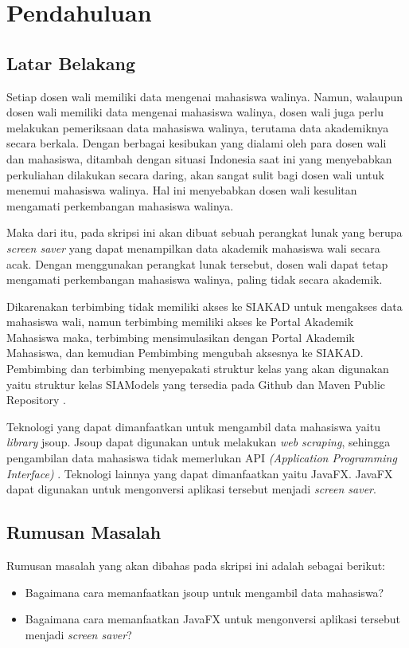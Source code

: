 \chapter{Pendahuluan}
\label{chap:intro}
   
\section{Latar Belakang}
\label{sec:label}

Setiap dosen wali memiliki data mengenai mahasiswa walinya. Namun, walaupun dosen wali memiliki data mengenai mahasiswa walinya, dosen wali juga perlu melakukan pemeriksaan data mahasiswa walinya, terutama data akademiknya secara berkala. Dengan berbagai kesibukan yang dialami oleh para dosen wali dan mahasiswa, ditambah dengan situasi Indonesia saat ini yang menyebabkan perkuliahan dilakukan secara daring, akan sangat sulit bagi dosen wali untuk menemui mahasiswa walinya. Hal ini menyebabkan dosen wali kesulitan mengamati perkembangan mahasiswa walinya. 

Maka dari itu, pada skripsi ini akan dibuat sebuah perangkat lunak yang berupa \textit{screen saver} yang dapat menampilkan data akademik mahasiswa wali secara acak. Dengan menggunakan perangkat lunak tersebut, dosen wali dapat tetap mengamati perkembangan mahasiswa walinya, paling tidak secara akademik.

Dikarenakan terbimbing tidak memiliki akses ke SIAKAD \cite{siakad} untuk mengakses data mahasiswa wali, namun terbimbing memiliki akses ke Portal Akademik Mahasiswa \cite{stupor} maka, terbimbing mensimulasikan dengan Portal Akademik Mahasiswa, dan kemudian Pembimbing mengubah aksesnya ke SIAKAD. Pembimbing dan terbimbing menyepakati struktur kelas yang akan digunakan yaitu struktur kelas SIAModels yang tersedia pada Github dan Maven Public Repository \cite{siamodels}.

Teknologi yang dapat dimanfaatkan untuk mengambil data mahasiswa yaitu \textit{library} jsoup. Jsoup dapat digunakan untuk melakukan \textit{web scraping}, sehingga pengambilan data mahasiswa tidak memerlukan API \textit{(Application Programming Interface)} \cite{jsoup}. Teknologi lainnya yang dapat dimanfaatkan yaitu JavaFX. JavaFX dapat digunakan untuk mengonversi aplikasi tersebut menjadi \textit{screen saver}.



\section{Rumusan Masalah}
\label{sec:rumusan}
Rumusan masalah yang akan dibahas pada skripsi ini adalah sebagai berikut:
\begin{itemize}
	\item Bagaimana cara memanfaatkan jsoup untuk mengambil data mahasiswa?
	\item Bagaimana cara memanfaatkan JavaFX untuk mengonversi aplikasi tersebut menjadi \textit{screen saver}?
\end{itemize}   

